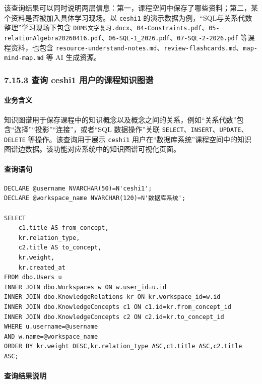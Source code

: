 \documentclass[10pt,a4paper,fontset=none]{ctexart}
\begin{document}
该查询结果可以同时说明两层信息：第一，课程空间中保存了哪些资料；第二，某个资料是否被加入具体学习现场。以 \texttt{ceshi1} 的演示数据为例，“SQL与关系代数整理”学习现场下包含 \texttt{DBMS文字复习.docx}、\texttt{04-Constraints.pdf}、\texttt{05-relationAlgebra20260416.pdf}、\texttt{06-SQL-1\_2026.pdf}、\texttt{07-SQL-2-2026.pdf} 等课程资料，也包含 \texttt{resource-understand-notes.md}、\texttt{review-flashcards.md}、\texttt{map-mind-map.md} 等 AI 生成资源。\par

\subsubsection*{7.15.3 查询 ceshi1 用户的课程知识图谱}

\paragraph*{业务含义}

知识图谱用于保存课程中的知识概念以及概念之间的关系，例如“关系代数”包含“选择”“投影”“连接”，或者“SQL 数据操作”关联 \texttt{SELECT}、\texttt{INSERT}、\texttt{UPDATE}、\texttt{DELETE} 等操作。该查询用于展示 \texttt{ceshi1} 用户在“数据库系统”课程空间中的知识图谱边数据。该功能对应系统中的知识图谱可视化页面。\par

\paragraph*{查询语句}

\begin{Verbatim}[fontsize=\scriptsize,frame=single]
DECLARE @username NVARCHAR(50)=N'ceshi1';
DECLARE @workspace_name NVARCHAR(120)=N'数据库系统';

SELECT
    c1.title AS from_concept,
    kr.relation_type,
    c2.title AS to_concept,
    kr.weight,
    kr.created_at
FROM dbo.Users u
INNER JOIN dbo.Workspaces w ON w.user_id=u.id
INNER JOIN dbo.KnowledgeRelations kr ON kr.workspace_id=w.id
INNER JOIN dbo.KnowledgeConcepts c1 ON c1.id=kr.from_concept_id
INNER JOIN dbo.KnowledgeConcepts c2 ON c2.id=kr.to_concept_id
WHERE u.username=@username
AND w.name=@workspace_name
ORDER BY kr.weight DESC,kr.relation_type ASC,c1.title ASC,c2.title ASC;
\end{Verbatim}

\paragraph*{查询结果说明}
\end{document}
